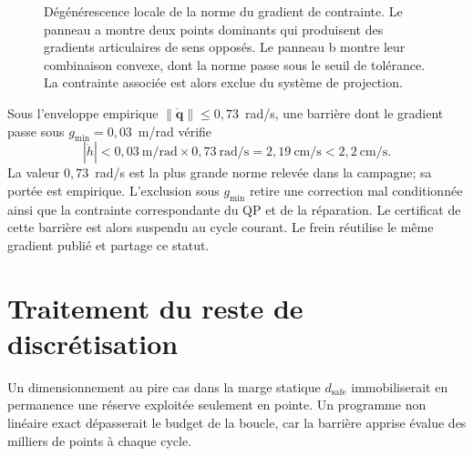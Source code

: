 \begin{figure}[htbp!]
    \caption{Dégénérescence locale de la norme du gradient de contrainte. Le panneau a montre deux points dominants qui produisent des gradients articulaires de sens opposés. Le panneau b montre leur combinaison convexe, dont la norme passe sous le seuil de tolérance. La contrainte associée est alors exclue du système de projection.}
    \label{fig:gradient_collapse}
\end{figure}

Sous l'enveloppe empirique $\|\dot{\mathbf{q}}\|\leq0{,}73$~rad/s, une barrière dont le gradient passe sous $g_{\min}=0{,}03$~m/rad vérifie
\begin{equation}
|\dot{h}| < 0{,}03~\text{m/rad} \times 0{,}73~\text{rad/s}
=2{,}19~\text{cm/s}<2{,}2~\text{cm/s}.
\end{equation}
La valeur $0{,}73$~rad/s est la plus grande norme relevée dans la campagne; sa portée est empirique. L'exclusion sous $g_{\min}$ retire une correction mal conditionnée ainsi que la contrainte correspondante du QP et de la réparation. Le certificat de cette barrière est alors suspendu au cycle courant. Le frein réutilise le même gradient publié et partage ce statut.

\section*{Traitement du reste de discrétisation}

Un dimensionnement au pire cas dans la marge statique $d_{\mathrm{safe}}$ immobiliserait en permanence une réserve exploitée seulement en pointe. Un programme non linéaire exact dépasserait le budget de la boucle, car la barrière apprise évalue des milliers de points à chaque cycle.

